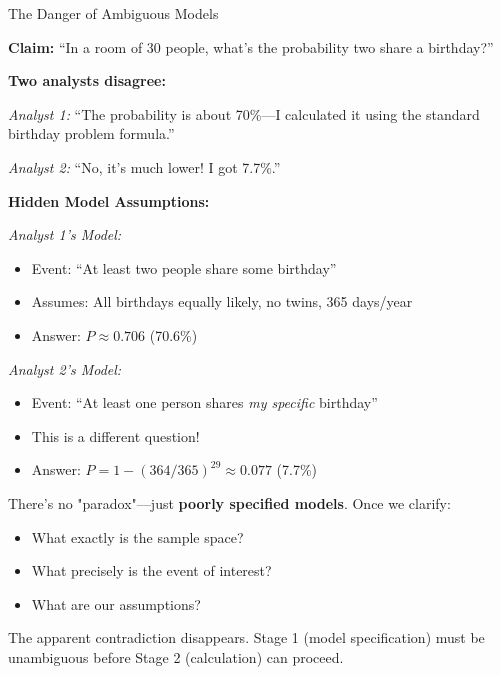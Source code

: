 \begin{exampleboxbreak}{The Danger of Ambiguous Models}


\textbf{Claim:} ``In a room of 30 people, what's the probability two share a birthday?''

\textbf{Two analysts disagree:}

\textit{Analyst 1:} ``The probability is about 70\%—I calculated it using the standard birthday problem formula.''

\textit{Analyst 2:} ``No, it's much lower! I got 7.7\%.''


\textbf{Hidden Model Assumptions:}

\textit{Analyst 1's Model:}
\begin{itemize}
    \item Event: ``At least two people share some birthday''
    \item Assumes: All birthdays equally likely, no twins, 365 days/year
    \item Answer: $P \approx 0.706$ (70.6\%)
\end{itemize}

\textit{Analyst 2's Model:}
\begin{itemize}
    \item Event: ``At least one person shares \textit{my specific} birthday''
    \item This is a different question!
    \item Answer: $P = 1 - (364/365)^{29} \approx 0.077$ (7.7\%)
\end{itemize}


There's no "paradox"—just \textbf{poorly specified models}. Once we clarify:
\begin{itemize}
    \item What exactly is the sample space?
    \item What precisely is the event of interest?
    \item What are our assumptions?
\end{itemize}

The apparent contradiction disappears. Stage 1 (model specification) must be unambiguous before Stage 2 (calculation) can proceed.

\end{exampleboxbreak}

